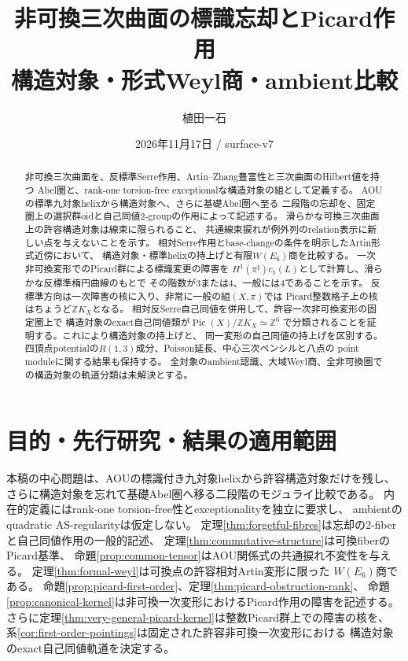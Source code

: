 \documentclass[11pt,a4paper]{ltjsarticle}
\title{非可換三次曲面の標識忘却とPicard作用\\\large 構造対象・形式Weyl商・ambient比較}
\author{植田一石}
\date{2026年11月17日 / surface-v7}
\theoremstyle{definition}\newtheorem{remark}[theorem]{注意}
\newcommand{\Pic}{\operatorname{Pic}}\newcommand{\Aut}{\operatorname{Aut}}
\begin{document}
\maketitle
\begin{abstract}
非可換三次曲面を、反標準Serre作用、Artin--Zhang豊富性と三次曲面のHilbert値を持つ
Abel圏と、rank-one torsion-free exceptionalな構造対象の組として定義する。
AOUの標準九対象helixから構造対象へ、さらに基礎Abel圏へ至る
二段階の忘却を、固定圏上の選択群oidと自己同値2-groupの作用によって記述する。
滑らかな可換三次曲面上の許容構造対象は線束に限られること、
共通線束捩れが例外列のrelation表示に新しい点を与えないことを示す。
相対Serre作用とbase-changeの条件を明示したArtin形式近傍において、
構造対象・標準helixの持上げと有限$W(E_6)$商を比較する。
一次非可換変形でのPicard群による標識変更の障害を
$H^1(\pi^\sharp)c_1(L)$として計算し、滑らかな反標準楕円曲線のもとで
その階数が3または4、一般には4であることを示す。
反標準方向は一次障害の核に入り、非常に一般の組$(X,\pi)$では
Picard整数格子上の核はちょうど$\mathbb ZK_X$となる。
相対反Serre自己同値を併用して、許容一次非可換変形の固定圏上で
構造対象のexact自己同値類が$\Pic(X)/\mathbb ZK_X\simeq\mathbb Z^6$
で分類されることを証明する。これにより構造対象の持上げと、
同一変形の自己同値の持上げを区別する。
四頂点potentialの$R(1,3)$成分、Poisson延長、中心三次ペンシルと八点の
point moduleに関する結果も保持する。
全対象のambient認識、大域Weyl商、全非可換圏での構造対象の軌道分類は未解決とする。
\end{abstract}
{\small\tableofcontents}
\clearpage


\section{目的・先行研究・結果の適用範囲}
本稿の中心問題は、AOUの標識付き九対象helixから許容構造対象だけを残し、
さらに構造対象を忘れて基礎Abel圏へ移る二段階のモジュライ比較である。
内在的定義にはrank-one torsion-free性とexceptionalityを独立に要求し、
ambientのquadratic AS-regularityは仮定しない。
定理\ref{thm:forgetful-fibres}は忘却の2-fiberと自己同値作用の一般的記述、
定理\ref{thm:commutative-structure}は可換fiberのPicard基準、
命題\ref{prop:common-tensor}はAOU関係式の共通捩れ不変性を与える。
定理\ref{thm:formal-weyl}は可換点の許容相対Artin変形に限った
$W(E_6)$商である。
命題\ref{prop:picard-first-order}、定理\ref{thm:picard-obstruction-rank}、
命題\ref{prop:canonical-kernel}は非可換一次変形におけるPicard作用の障害を記述する。
さらに定理\ref{thm:very-general-picard-kernel}は整数Picard群上での障害の核を、
系\ref{cor:first-order-pointings}は固定された許容非可換一次変形における
構造対象のexact自己同値軌道を決定する。
\end{document}
